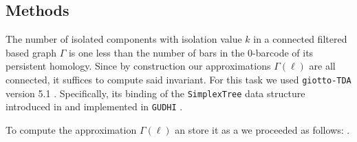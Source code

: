 \subsection{Methods}

The number of isolated components with isolation value $k$ in a connected filtered based graph $\Gamma$ is one less than the number of bars in the 0-barcode of its persistent homology.
Since by construction our approximations $\Gamma(\ell)$ are all connected, it suffices to compute said invariant.
For this task we used \texttt{giotto-TDA} version 5.1 \cite{tauzin2021giotto}.
Specifically, its binding of the \texttt{SimplexTree} data structure introduced in \cite{boissonnat2014simplex} and implemented in \texttt{GUDHI} \cite{maria2014gudhi}.

To compute the approximation $\Gamma(\ell)$ an store it as a  we proceeded as follows: .